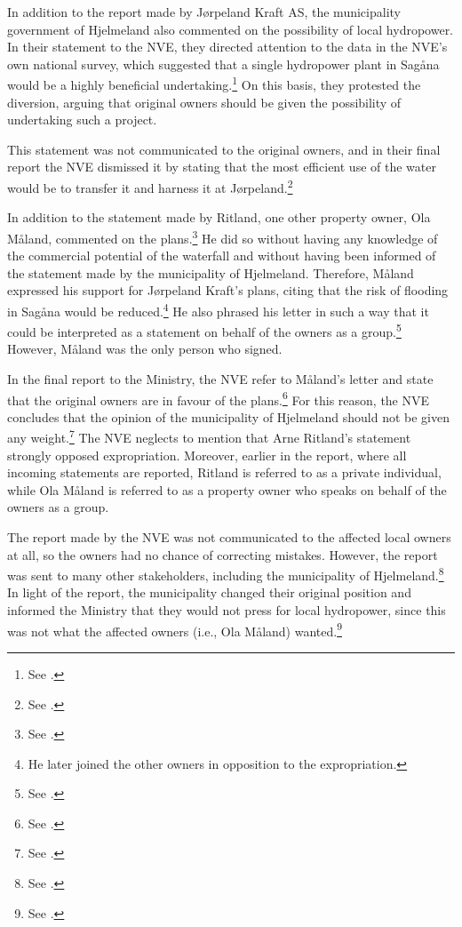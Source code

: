 In addition to the report made by Jørpeland Kraft AS, the municipality government of Hjelmeland also commented on the possibility of local hydropower. In their statement to the NVE, they directed attention to the data in the NVE's own national survey, which suggested that a single hydropower plant in Sagåna would be a highly beneficial undertaking.\footnote{See \cite[19]{jorpeland09}.} On this basis, they protested the diversion, arguing that original owners should be given the possibility of undertaking such a project.

This statement was not communicated to the original owners, and in their final report the NVE dismissed it by stating that the most efficient use of the water would be to transfer it and harness it at Jørpeland.\footnote{See \cite[19]{jorpeland09}.}

In addition to the statement made by Ritland, one other property owner, Ola Måland, commented on the plans.\footnote{See \cite[17]{jorpeland09}.} He did so without having any knowledge of the commercial potential of the waterfall and without having been informed of the statement made by the municipality of Hjelmeland. Therefore, Måland expressed his support for Jørpeland Kraft's plans, citing that the risk of flooding in Sagåna would be reduced.\footnote{He later joined the other owners in opposition to the expropriation.} He also phrased his letter in such a way that it could be interpreted as a statement on behalf of the owners as a group.\footnote{See \cite[17]{jorpeland09}.} However, Måland was the only person who signed.

In the final report to the Ministry, the NVE refer to Måland's letter and state that the original owners are in favour of the plans.\footnote{See \cite[19]{jorpeland09}.} For this reason, the NVE concludes that the opinion of the municipality of Hjelmeland should not be given any weight.\footnote{See \cite[19]{jorpeland09}.} The NVE neglects to mention that Arne Ritland's statement strongly opposed expropriation. Moreover, earlier in the report, where all incoming statements are reported, Ritland is referred to as a private individual, while Ola Måland is referred to as a property owner who speaks on behalf of the owners as a group.

The report made by the NVE was not communicated to the affected local owners at all, so the owners had no chance of correcting mistakes. However, the report was sent to many other stakeholders, including the municipality of Hjelmeland.\footnote{See \cite[24]{jorpeland09}.} In light of the report, the municipality changed their original position and informed the Ministry that they would not press for local hydropower, since this was not what the affected owners (i.e., Ola Måland) wanted.\footnote{See \cite[24]{jorpeland09}.}


